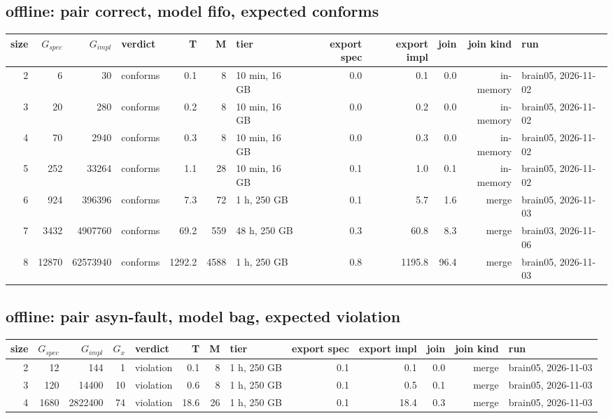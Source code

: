 \documentclass[10pt]{article}
\begin{document}
\subsection*{offline: pair \textsf{correct}, model fifo, expected conforms}
\begin{longtable}{@{}rrrlrrlrrrrl@{}}
\toprule
size & $G_{\mathit{spec}}$ & $G_{\mathit{impl}}$ & verdict & T & M & tier & export spec & export impl & join & join kind & run \\
\midrule
\endhead
\color{red} 2 & 6 & 30 & conforms & 0.1 & 8 & 10 min, 16 GB & 0.0 & 0.1 & 0.0 & in-memory & brain05, 2026-11-02 \\
\color{red} 3 & 20 & 280 & conforms & 0.2 & 8 & 10 min, 16 GB & 0.0 & 0.2 & 0.0 & in-memory & brain05, 2026-11-02 \\
\color{red} 4 & 70 & 2940 & conforms & 0.3 & 8 & 10 min, 16 GB & 0.0 & 0.3 & 0.0 & in-memory & brain05, 2026-11-02 \\
\color{red} 5 & 252 & 33264 & conforms & 1.1 & 28 & 10 min, 16 GB & 0.1 & 1.0 & 0.1 & in-memory & brain05, 2026-11-02 \\
\color{blue} 6 & 924 & 396396 & conforms & 7.3 & 72 & 1 h, 250 GB & 0.1 & 5.7 & 1.6 & merge & brain05, 2026-11-03 \\
\color{blue} 7 & 3432 & 4907760 & conforms & 69.2 & 559 & 48 h, 250 GB & 0.3 & 60.8 & 8.3 & merge & brain03, 2026-11-06 \\
\color{blue} 8 & 12870 & 62573940 & conforms & 1292.2 & 4588 & 1 h, 250 GB & 0.8 & 1195.8 & 96.4 & merge & brain05, 2026-11-03 \\
\bottomrule
\end{longtable}
\subsection*{offline: pair \textsf{asyn-fault}, model bag, expected violation}
\begin{longtable}{@{}rrrrlrrlrrrrl@{}}
\toprule
size & $G_{\mathit{spec}}$ & $G_{\mathit{impl}}$ & $G_x$ & verdict & T & M & tier & export spec & export impl & join & join kind & run \\
\midrule
\endhead
\color{blue} 2 & 12 & 144 & 1 & violation & 0.1 & 8 & 1 h, 250 GB & 0.1 & 0.1 & 0.0 & merge & brain05, 2026-11-03 \\
\color{blue} 3 & 120 & 14400 & 10 & violation & 0.6 & 8 & 1 h, 250 GB & 0.1 & 0.5 & 0.1 & merge & brain05, 2026-11-03 \\
\color{blue} 4 & 1680 & 2822400 & 74 & violation & 18.6 & 26 & 1 h, 250 GB & 0.1 & 18.4 & 0.3 & merge & brain05, 2026-11-03 \\
\bottomrule
\end{longtable}
\end{document}
